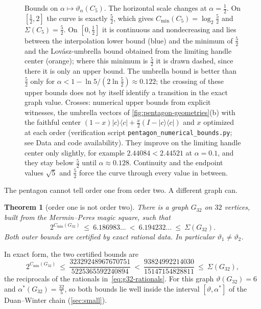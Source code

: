 \documentclass[11pt]{article}
\newtheorem{mainthm}{Theorem}
\theoremstyle{definition}
\newcommand{\vt}{\vartheta}
\newcommand{\Cmin}{C_{\min}}
\newcommand{\ket}[1]{\lvert #1\rangle}
\newcommand{\bra}[1]{\langle #1\rvert}
\newcommand{\proj}[1]{\ket{#1}\!\bra{#1}}
\begin{document}
\begin{figure}[t]
\caption{Bounds on $\alpha\mapsto\vt_\alpha(C_5)$.  The
horizontal scale changes at $\alpha=\tfrac12$.  On $[\tfrac12,2]$ the curve is
exactly $\tfrac52$, which gives $\Cmin(C_5)=\log_2\tfrac52$ and
$\Sigma(C_5)=\tfrac52$.  On $[0,\tfrac12]$ it is continuous and nondecreasing
and lies between the interpolation lower bound (blue) and the minimum of
$\tfrac52$ and the Lov\'asz-umbrella bound obtained from the limiting
handle center (orange); where this minimum is $\tfrac52$ it is drawn dashed,
since there it is only an upper bound.  The umbrella bound is better than $\tfrac52$
only for $\alpha<1-\ln5/(2\ln\frac52)\approx0.122$; the crossing of these
upper bounds does not by itself identify a transition in the exact graph value.
Crosses: numerical upper bounds from explicit witnesses, the umbrella vectors
of \cref{fig:pentagon-geometries}(b) with the faithful center
$(1-x)\proj c+\tfrac x2(I-\proj c)$ and $x$ optimized at each order
(verification script \texttt{pentagon\_numerical\_bounds.py}; see Data and
code availability).  They improve on the
limiting handle center only slightly, for example $2.44084<2.44521$ at
$\alpha=0.1$, and they stay below $\tfrac52$ until $\alpha\approx0.128$.
Continuity and the endpoint values $\sqrt5$ and $\tfrac52$ force the curve
through every value in between.}
\label{fig:pentagon-curve}
\end{figure}

The pentagon cannot tell order one from order two.  A different graph can.

\begin{mainthm}[order one is not order two]\label{thm:C}
There is a graph $G_{32}$ on $32$ vertices, built from the Mermin--Peres
magic square, such that
\[
 2^{\Cmin(G_{32})}\ \le\ 6.186983\ldots\ <\ 6.194232\ldots\ \le\ \Sigma(G_{32}).
\]
Both outer bounds are certified by exact rational data.  In particular
$\vt_1\ne\vt_2$.
\end{mainthm}

In exact form, the two certified bounds are
\[
 2^{\Cmin(G_{32})}\ \le\ \frac{32329248967670751}{5225365592240894}
 \ <\ \frac{93824992214030}{15147154828811}\ \le\ \Sigma(G_{32}),
\]
the reciprocals of the rationals in~\eqref{eq:g32-rationals}.
For this graph $\vt(G_{32})=6$ and $\alpha^*(G_{32})=\tfrac{32}5$, so both
bounds lie well inside the interval $[\vt,\alpha^*]$ of the Duan--Winter chain
(\cref{sec:small}).
\end{document}
